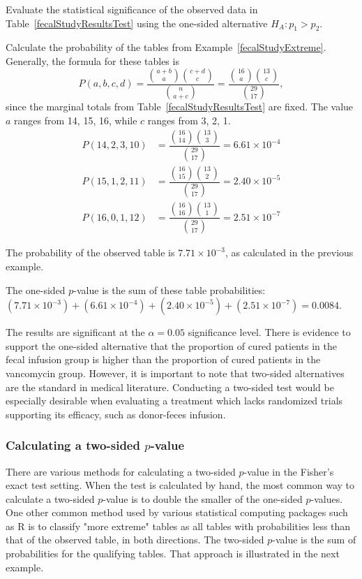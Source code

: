 \begin{example}{Evaluate the statistical significance of the observed data in Table~\ref{fecalStudyResultsTest} using the one-sided alternative $H_A: p_1 > p_2$.}

Calculate the probability of the tables from Example~\ref{fecalStudyExtreme}. Generally, the formula for these tables is 
\[P(a, b, c, d) = \dfrac{ {a+b \choose a} {c+d \choose c}}{{n \choose a+c}} = \dfrac{ {16 \choose a} {13 \choose c}}{{29 \choose 17}},\] 
since the marginal totals from Table~\ref{fecalStudyResultsTest} are fixed. The value $a$ ranges from 14, 15, 16, while $c$ ranges from 3, 2, 1.
\begin{align*}
P(14, 2, 3, 10) &= \dfrac{ {16 \choose 14} {13 \choose 3}}{{29 \choose 17}} = 6.61 \times 10^{-4} \\
P(15, 1, 2, 11) &= \dfrac{ {16 \choose 15} {13 \choose 2}}{{29 \choose 17}} = 2.40 \times 10^{-5} \\
P(16, 0, 1, 12) &= \dfrac{ {16 \choose 16} {13 \choose 1}}{{29 \choose 17}} = 2.51 \times 10^{-7}
\end{align*}

The probability of the observed table is $7.71 \times 10^{-3}$, as calculated in the previous example.

The one-sided $p$-value is the sum of these table probabilities: $(7.71 \times 10^{-3}) + (6.61 \times 10^{-4}) + (2.40 \times 10^{-5}) + (2.51 \times 10^{-7}) = 0.0084.$

The results are significant at the $\alpha = 0.05$ significance level. There is evidence to support the one-sided alternative that the proportion of cured patients in the fecal infusion group is higher than the proportion of cured patients in the vancomycin group. However, it is important to note that two-sided alternatives are the standard in medical literature. Conducting a two-sided test would be especially desirable when evaluating a treatment which lacks randomized trials supporting its efficacy, such as donor-feces infusion.
\end{example}

\subsubsection{Calculating a two-sided $p$-value}

There are various methods for calculating a two-sided $p$-value in the Fisher's exact test setting. When the test is calculated by hand, the most common way to calculate a two-sided $p$-value is to double the smaller of the one-sided $p$-values. One other common method used by various statistical computing packages such as \textsf{R} is to classify "more extreme" tables as all tables with probabilities less than that of the observed table, in both directions. The two-sided $p$-value is the sum of probabilities for the qualifying tables.  That approach is illustrated in the next example.

